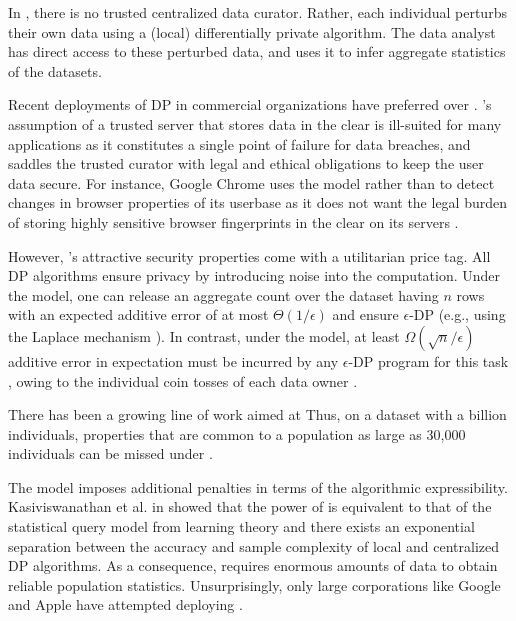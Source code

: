 In \ldp, there is no trusted centralized data curator. Rather, each individual perturbs their own data using a (local) differentially private algorithm. The data analyst has direct access to these perturbed data, and uses it to infer aggregate statistics of the datasets. %


Recent deployments of DP in commercial organizations \cite{Rappor1, Apple} have preferred  \ldp over \cdp. \cdp's assumption of a trusted server that stores data in the clear is ill-suited for many applications as it constitutes a single point of failure for data breaches, and saddles the trusted curator with legal and ethical obligations to keep the user data secure. For instance, Google Chrome uses the \ldp model rather than \cdp to detect changes in browser properties of its userbase as it does not want the legal burden of storing highly sensitive browser fingerprints in the clear on its servers \cite{Rappor1}. 
  

However, \ldp's attractive security properties come with a utilitarian price tag. All DP algorithms ensure privacy by introducing noise into the computation. Under the \cdp model, one can release an aggregate count over the dataset having $n$ rows with an expected additive error of at most $\Theta(1/\epsilon)$ and ensure $\epsilon$-DP (e.g., using the Laplace mechanism \cite{dwork}). In contrast, under the \ldp model, at least $\Omega(\sqrt{n}/\epsilon)$ additive error in expectation must be incurred by any $\epsilon$-DP program for this task \cite{error1,error2,error3}, owing to the individual coin tosses of each data owner \cite{Prochlo,Rappor1,Rappor2,LDP1}. %

There has been a growing line of work \cite{}{} aimed at 
Thus, on a dataset with a billion individuals, properties that are common to a population as large as 30,000 individuals can be missed under \ldp. 

The \ldp model imposes additional penalties in terms of the  algorithmic expressibility.  Kasiviswanathan et al. in \cite{Kasivi} showed that the power of \ldp is equivalent to that of the statistical query model \cite{SQ1} from learning theory and there exists an exponential separation between the accuracy and sample complexity of local and centralized DP algorithms.  As a consequence, \ldp requires enormous amounts of data to obtain reliable population statistics. Unsurprisingly, only large corporations  like Google \cite{Rappor1,Rappor2,Prochlo} and Apple \cite{Apple} have attempted deploying \ldp.
 
